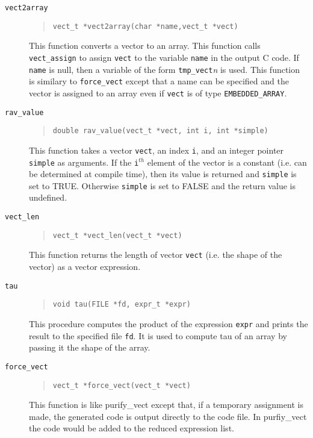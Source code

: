 \begin{description}
\item[{\tt vect2array}]
\begin{quote}
\begin{verbatim}
vect_t *vect2array(char *name,vect_t *vect)
\end{verbatim}
\end{quote}
This function converts a vector to an array.  This function calls
{\tt vect\_assign} to assign {\tt vect} to the variable {\tt name} in
the output C code.  If {\tt name} is null, then a variable of the
form {\tt tmp\_vect}{\it n} is used.  This function is similary to 
{\tt force\_vect} except that a name can be specified and the
vector is assigned to an array even if {\tt vect} is of type
{\tt EMBEDDED\_ARRAY}.

\item[{\tt rav\_value}]
\begin{quote}
\begin{verbatim}
double rav_value(vect_t *vect, int i, int *simple)
\end{verbatim}
\end{quote}
This function takes a vector {\tt vect}, an index {\tt i}, and an integer
pointer {\tt simple} as arguments.
If the {\tt i}$^{th}$ element of the vector is a constant (i.e. can
be determined at compile time), then
its value is returned and {\tt simple} is set to TRUE.
Otherwise {\tt simple} is set to FALSE and the return value is undefined.

\item[{\tt vect\_len}]
\begin{quote}
\begin{verbatim}
vect_t *vect_len(vect_t *vect)
\end{verbatim}
\end{quote}
This function returns the length of vector {\tt vect} (i.e. the shape of
the vector) as a vector expression.

\item[{\tt tau}]
\begin{quote}
\begin{verbatim}
void tau(FILE *fd, expr_t *expr)
\end{verbatim}
\end{quote}
This procedure computes the product of the expression {\tt expr} 
and prints the result to the specified file {\tt fd}.
It is used to compute tau of an array by passing 
it the shape of the array.

\item[{\tt force\_vect}]
\begin{quote}
\begin{verbatim}
vect_t *force_vect(vect_t *vect)
\end{verbatim}
\end{quote}
This function is like purify\_vect except that, if a temporary assignment
is made, the generated code is output directly to the code file.  In 
purfiy\_vect the code would be added to the reduced expression list.


\end{description}
